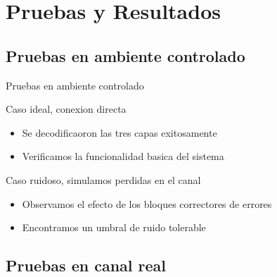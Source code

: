 \section{Pruebas y Resultados}

\subsection{Pruebas en ambiente controlado}
\begin{frame}{Pruebas en ambiente controlado}
\begin{block}{Caso ideal, conexion directa}
	\begin{itemize}
		\item { Se decodificaoron las tres capas exitosamente }
		\item { Verificamos la funcionalidad basica del sistema }
	\end{itemize}
\end{block}

\begin{block}{Caso ruidoso, simulamos perdidas en el canal}
	\begin{itemize}
		\item {	Observamos el efecto de los bloques correctores de errores }
		\item { Encontramos un umbral de ruido tolerable }
	\end{itemize}
\end{block}
\end{frame}

\subsection{Pruebas en canal real}


